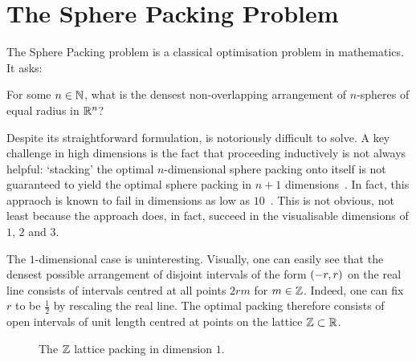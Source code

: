 \section{The Sphere Packing Problem}\label{Ch1:Sec:1_1_Sphere_Packing}

The Sphere Packing problem is a classical optimisation problem in mathematics. It asks:

\begin{boxproblem}\label{Ch1:Prob:SpherePacking_n}
    For some $n \in \mathbb{N}$, what is the densest non-overlapping arrangement of $n$-spheres of equal radius in $\mathbb{R}^n$?
\end{boxproblem}

Despite its straightforward formulation,  is notoriously difficult to solve. A key challenge in high dimensions is the fact that proceeding inductively is not always helpful: `stacking' the optimal $n$-dimensional sphere packing onto itself is not guaranteed to yield the optimal sphere packing in $n + 1$ dimensions~\cite{CohnOnViazovskaICM}. In fact, this appraoch is known to fail in dimensions as low as $10$~\cite{CohnOnViazovskaAMS}. This is not obvious, not least because the approach does, in fact, succeed in the visualisable dimensions of $1$, $2$ and $3$.

The $1$-dimensional case is uninteresting. Visually, one can easily see that the densest possible arrangement of disjoint intervals of the form $\left( -r, r \right)$ on the real line consists of intervals centred at all points $2rm$ for $m \in \mathbb{Z}$. Indeed, one can fix $r$ to be $\frac{1}{2}$ by rescaling the real line. The optimal packing therefore consists of open intervals of unit length centred at points on the lattice $\mathbb{Z} \subset \mathbb{R}$.

\begin{figure}[htb]
    \centering
    \caption{The $\mathbb{Z}$ lattice packing in dimension $1$.}
    \label{Ch1:Fig:Z_Lattice_Packing_1D}
\end{figure}


